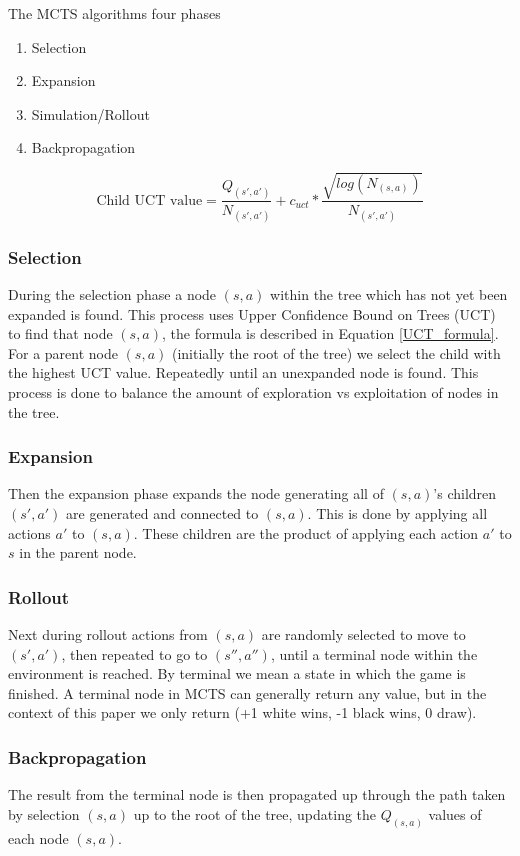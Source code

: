 The MCTS algorithms four phases
\begin{enumerate}
  \item Selection
  \item Expansion
  \item Simulation/Rollout
  \item Backpropagation
\end{enumerate}


\begin{equation} \label{UCT_formula}
  \text{Child UCT value} = \frac{Q_{(s',a')}}{N_{(s',a')}} + c_{uct} * \frac{\sqrt{log(N_{(s,a)})}}{N_{(s',a')}}
\end{equation}

\subsubsection*{Selection}
During the selection phase a node $(s,a)$ within the tree which has not yet been expanded is found.
This process uses Upper Confidence Bound on Trees (UCT) to find that node $(s,a)$, the formula is described in Equation \ref{UCT_formula}. For a parent node $(s,a)$
(initially the root of the tree) we select the child with the highest UCT value. Repeatedly until an unexpanded
node is found. This process is done to balance the amount of exploration vs exploitation of nodes in the
tree.

\subsubsection*{Expansion}
Then the expansion phase expands the node generating all of $(s,a)$'s children $(s',a')$ are generated
and connected to $(s,a)$. This is done by applying all actions $a'$ to $(s,a)$. These children are the
product of applying each action $a'$ to $s$ in the parent node.

\subsubsection*{Rollout}
Next during rollout actions from $(s,a)$ are randomly selected to move to $(s',a')$, then repeated
to go to $(s'',a'')$, until a terminal node within the environment is reached. By terminal we mean a
state in which the game is finished. A terminal node in MCTS can generally return any value, but in the
context of this paper we only return (+1 white wins, -1 black wins, 0 draw).


\subsubsection*{Backpropagation}
The result from the terminal node is then propagated up through the path taken by selection $(s,a)$ up
to the root of the tree, updating the $Q_{(s,a)}$ values of each node $(s,a)$.

